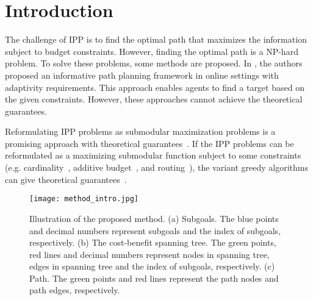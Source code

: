 \chapter{Introduction}

The challenge of IPP is to find the optimal path that maximizes the information subject to budget constraints.
However, finding the optimal path is a NP-hard problem.
To solve these problems, some methods are proposed.
In \cite{popovic2017multiresolution}\cite{popovic2020informative}, the authors proposed an informative path planning framework in online settings with adaptivity requirements.
This approach enables agents to find a target based on the given constraints. However, these approaches cannot achieve the theoretical guarantees.



Reformulating IPP problems as submodular maximization problems
is a promising approach with theoretical guarantees~\cite{nemhauser1978analysis}.
If the IPP problems can be reformulated as a maximizing submodular function subject to some constraints (e.g. cardinality~\cite{nemhauser1978analysis}, additive budget~\cite{khuller1999budgeted}, and routing~\cite{zhang2016submodular}), the variant greedy algorithms can give theoretical guarantees~\cite{nemhauser1978analysis}\cite{feige1998threshold}.

\begin{figure}[htbp]
\centering
\texttt{[image: method\_intro.jpg]}
\caption{ Illustration of the proposed method.
(a) Subgoals.
The blue points and decimal numbers represent subgoals and the index of subgoals, respectively.
(b) The cost-benefit spanning tree.
The green points, red lines and decimal numbers represent nodes in spanning tree, edges in spanning tree and the index of subgoals, respectively.
(c) Path.
The green points and red lines represent the path nodes and path edges, respectively.
}
\label{fig:method_intro}
 \end{figure}

